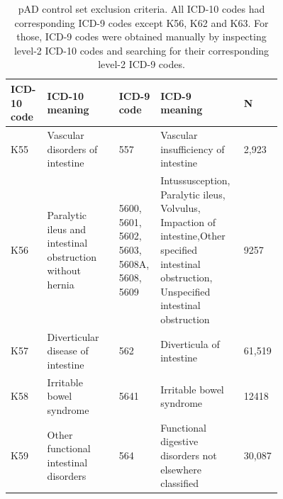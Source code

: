 \begin{table}[H]
  \caption[UKBB pAD control exclusion criteria]{pAD control set exclusion criteria. All ICD-10 codes had corresponding ICD-9 codes except K56, K62 and K63. For those, ICD-9 codes were obtained manually by inspecting level-2 ICD-10 codes and searching for their corresponding level-2 ICD-9 codes.}
  \label{table:ukbb_ctrl_excl_criteria}
  \fontsize{10}{11}\selectfont

  \begin{tabular}{|p{0.1\linewidth}|p{0.25\linewidth}|p{0.1\linewidth}|p{0.25\linewidth}|p{0.06\linewidth}|}
  \hline
  \textbf{ICD-10 code} & \textbf{ICD-10
   meaning}                                            & \textbf{ICD-9 code}                          & \textbf{ICD-9 meaning}     & \textbf{N}                                                                                                                                                          \\ \hline
  K55         & Vascular disorders of intestine                           & 557                                 & Vascular insufficiency of intestine       & 2,923                                                                                                                                  \\ \hline
  K56         & Paralytic ileus and intestinal obstruction without hernia & 5600, 5601, 5602, 5603, 5608A, 5608, 5609 & Intussusception, Paralytic ileus, Volvulus, Impaction of intestine,Other specified intestinal obstruction, Unspecified intestinal obstruction & 9257                              \\ \hline
  K57         & Diverticular disease of intestine                         & 562                                 & Diverticula of intestine              &     61,519                                                                                                                                  \\ \hline
  K58         & Irritable bowel syndrome                                  & 5641                                & Irritable bowel syndrome          & 12418                                                                                                                                          \\ \hline
  K59         & Other functional intestinal disorders                     & 564                                 & Functional digestive disorders not elsewhere classified      & 30,087                                                                                                               \\ \hline

\end{tabular}
\end{table}
